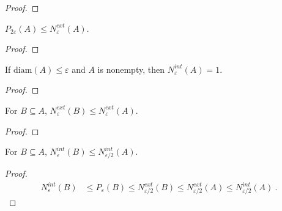 \begin{proof}\leanok

\end{proof}


\begin{lemma}\label{lem:packingNumber_two_le_externalCoveringNumber}
  \mathlibok
$P_{2\varepsilon}(A) \le N^{ext}_\varepsilon(A)$.
\end{lemma}

\begin{proof}\leanok

\end{proof}


\begin{lemma}\label{lem:internalCoveringNumber_eq_one_of_diam_le}
  \mathlibok
If $\mathrm{diam}(A) \le \varepsilon$ and $A$ is nonempty, then $N^{int}_\varepsilon(A) = 1$.
\end{lemma}

\begin{proof}\leanok

\end{proof}


\begin{lemma}\label{lem:externalCoveringNumber_mono}
  \mathlibok
For $B \subseteq A$, $N^{ext}_\varepsilon(B) \le N^{ext}_{\varepsilon}(A)$.
\end{lemma}

\begin{proof}\leanok

\end{proof}


\begin{lemma}\label{lem:internalCoveringNumber_subset_le}
  \mathlibok
For $B \subseteq A$, $N^{int}_\varepsilon(B) \le N^{int}_{\varepsilon/2}(A)$.
\end{lemma}

\begin{proof}\leanok
\begin{align*}
  N^{int}_\varepsilon(B)
  &\le P_{\varepsilon}(B)
  \le N^{ext}_{\varepsilon/2}(B)
  \le N^{ext}_{\varepsilon/2}(A)
  \le N^{int}_{\varepsilon/2}(A)
  \: .
\end{align*}
\end{proof}



